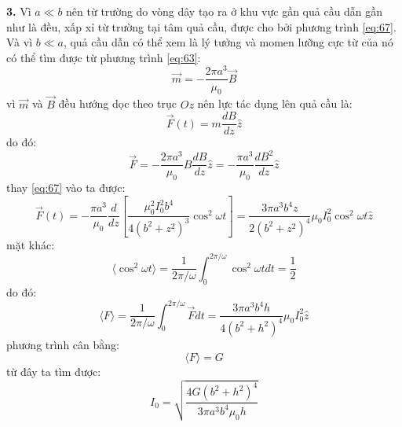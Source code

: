 \noindent\textbf{3.} Vì $a\ll b$ nên từ trường do vòng dây tạo ra ở khu vực gần quả cầu dẫn gần như là đều, xấp xỉ từ trường tại tâm quả cầu, được cho bởi phương trình \eqref{eq:67}. Và vì $b\ll a$, quả cầu dẫn có thể xem là lý tưởng và momen lưỡng cực từ của nó có thể tìm được từ phương trình \eqref{eq:63}:
\begin{equation}
  \label{eq:68}
  \vec{m}=-\frac{2\pi a^{3}}{\mu_{0}}\vec{B}
\end{equation}
vì $\vec{m}$ và $\vec{B}$ đều hướng dọc theo trục $Oz$ nên lực tác dụng lên quả cầu là:
\begin{equation*}
  \vec{F}(t)=m\frac{dB}{dz}\hat{z}
\end{equation*}
do đó:
\begin{equation*}
  \vec{F}=-\frac{2\pi a^{3}}{\mu_{0}}B\frac{dB}{dz}\hat{z}=-\frac{\pi a^{3}}{\mu_{0}}\frac{dB^{2}}{dz}\hat{z}
\end{equation*}
thay \eqref{eq:67} vào ta được:
\begin{equation}
  \label{eq:69}
  \vec{F}(t)=-\frac{\pi a^{3}}{\mu_{0}}\frac{d}{dz}\left[\frac{\mu_{0}^{2}I_{0}^{2}b^{4}}{4(b^{2}+z^{2})^{3}}\cos^{2}\omega t\right]=\frac{3\pi a^{3}b^{4}z}{2(b^{2}+z^{2})^{4}}\mu_{0}I_{0}^{2}\cos^{2}\omega t\hat{z}
\end{equation}
mặt khác:
\begin{equation*}
  \langle \cos^{2}\omega t \rangle=\frac{1}{2\pi/\omega}\int_{0}^{2\pi/\omega}\cos^{2}\omega tdt=\frac{1}{2}
\end{equation*}
do đó:
\begin{equation}
  \label{eq:610}
  \langle F \rangle=\frac{1}{2\pi/\omega}\int_{0}^{2\pi/\omega}\vec{F}dt=\frac{3\pi a^{3}b^{4}h}{4(b^{2}+h^{2})^{4}}\mu_{0}I_{0}^{2}\hat{z}
\end{equation}
phương trình cân bằng:
\begin{equation}
  \label{eq:611}
  \langle F \rangle = G
\end{equation}
từ đây ta tìm được:
\begin{equation}
  \label{eq:611}
  I_{0}=\sqrt{\frac{4G(b^{2}+h^{2})^{4}}{3\pi a^{3}b^{4}\mu_{0} h}}
\end{equation}

